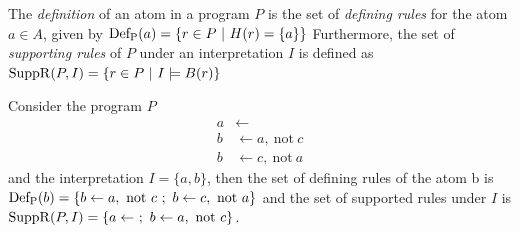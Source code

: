The \emph{definition} of an atom in a program $P$ is the set of \emph{defining rules} for the atom \(a \in A\), given by
\(
    \operatorname{Def_P}(a) = \{r \in P \ | \ H(r) = \{a\}\}
\)
Furthermore, the set of \emph{supporting rules} of $P$ under an interpretation $I$ is defined as
\(
    \SuppR(P, I) = \{r \in P \ | \ I \models B(r)\}
\)
\begin{example}
\label{ex:def/supp}
    Consider the program $P$
    \begin{align*}
        a &\leftarrow \\
        b &\leftarrow a,\ \text{not}\ c \\
        b &\leftarrow c,\ \text{not}\ a
    \end{align*}
    and the interpretation \(I = \{a, b\}\), then the set of defining rules of the atom b is \(\operatorname{Def_P}(b) = \{b \leftarrow a,\ \text{not}\ c\ ;\ b \leftarrow c,\ \text{not}\ a\}\) and the set of supported rules under $I$ is \(\operatorname{SuppR}(P, I) = \{a \leftarrow\ ;\ b \leftarrow a,\ \text{not}\ c\}\).
\end{example}


